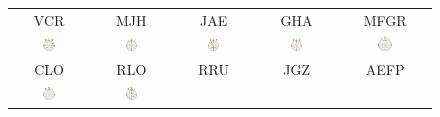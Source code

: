 \begin{figure}
\centering
\begin{tabular}{ccccc}
VCR & MJH & JAE & GHA & MFGR \\
\includegraphics[width=0.17\textwidth]{./img_diagramas/cabeza_new_VCR.pdf} &
\includegraphics[width=0.17\textwidth]{./img_diagramas/cabeza_new_MJH.pdf} &
\includegraphics[width=0.17\textwidth]{./img_diagramas/cabeza_new_JAE.pdf} &
\includegraphics[width=0.17\textwidth]{./img_diagramas/cabeza_new_GHA.pdf} &
\includegraphics[width=0.17\textwidth]{./img_diagramas/cabeza_new_MFGR.pdf} \\
CLO & RLO & RRU & JGZ & AEFP \\
\includegraphics[width=0.17\textwidth]{./img_diagramas/cabeza_new_CLO.pdf} &
\includegraphics[width=0.17\textwidth]{./img_diagramas/cabeza_new_RLO.pdf} &

\end{tabular}
\end{figure}
